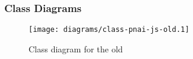 
\subsubsection{Class Diagrams} %
\label{ssub:classdiagramsold}

\begin{figure}[htbp]
  \centering
    \texttt{[image: diagrams/class-pnai-js-old.1]}
  \caption{Class diagram for the old }
  \label{fig:classdiagramsold}
\end{figure}

